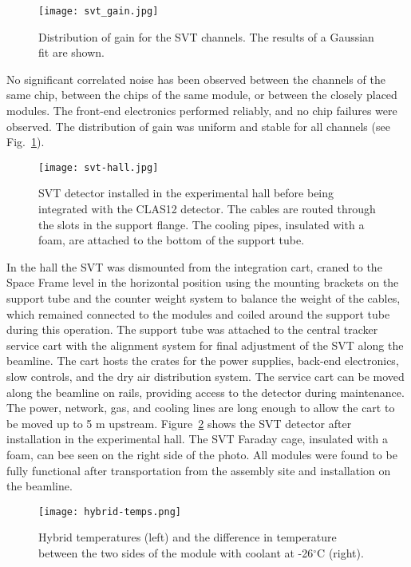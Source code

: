 \begin{figure}[hbt] 
\centering 
\texttt{[image: svt\_gain.jpg]}
\caption{Distribution of gain for the SVT channels. The results of a Gaussian fit are shown.}
\label{fig:svt_gain}
\end{figure}

No significant correlated noise has been observed between the channels of the same chip, between the chips of the same module, or between the closely placed modules. The front-end electronics performed reliably, and no chip failures were observed. The distribution of gain was uniform and stable for all channels (see Fig.~\ref{fig:svt_gain}). 
 
\begin{figure}[hbt] 
\centering 
\texttt{[image: svt-hall.jpg]}
\caption{SVT detector installed in the experimental hall before being integrated with the CLAS12 detector. The cables are routed through the slots in the support flange. The cooling pipes, insulated with a foam, are attached to the bottom of the support tube.}
\label{fig:svt-hall}
\end{figure}

In the hall the SVT was dismounted from the integration cart, craned to the Space Frame level in the horizontal position using the mounting brackets on the support tube and the counter weight system to balance the weight of the cables, which remained connected to the modules and coiled around the support tube during this operation. The support tube was attached to the central tracker service cart with the alignment system for final adjustment of the SVT along the beamline. The cart hosts the crates for the power supplies, back-end electronics, slow controls, and the dry air distribution system. The service cart can be moved along the beamline on rails, providing access to the detector during maintenance. The power, network, gas, and cooling lines are long enough to allow the cart to be moved up to 5 m upstream. Figure~\ref{fig:svt-hall} shows the SVT detector after installation in the experimental hall. The SVT Faraday cage, insulated with a foam, can bee seen on the right side of the photo. All modules were found to be fully functional after transportation from the assembly site and installation on the beamline. 

\begin{figure}[hbt] 
\centering 
\texttt{[image: hybrid-temps.png]}
\caption{Hybrid temperatures (left) and the difference in temperature between the two sides of the module with coolant at -26$^\circ$C (right).}
\label{fig:hybrid-temps}
\end{figure}

